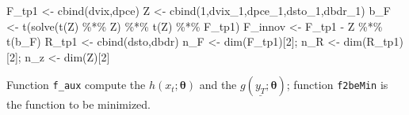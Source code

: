 \documentclass[
  12pt,
]{book}
\newenvironment{Shaded}{\begin{snugshade}}{\end{snugshade}}
\newcommand{\DecValTok}[1]{\textcolor[rgb]{0.00,0.00,0.81}{#1}}
\newcommand{\FunctionTok}[1]{\textcolor[rgb]{0.00,0.00,0.00}{#1}}
\newcommand{\NormalTok}[1]{#1}
\newcommand{\OtherTok}[1]{\textcolor[rgb]{0.56,0.35,0.01}{#1}}
\newcommand{\SpecialCharTok}[1]{\textcolor[rgb]{0.00,0.00,0.00}{#1}}
\theoremstyle{definition}
\theoremstyle{definition}
\theoremstyle{definition}
\theoremstyle{definition}
\theoremstyle{remark}
\begin{document}
\begin{Shaded}
\begin{Highlighting}[]
\NormalTok{F\_tp1 }\OtherTok{\textless{}{-}} \FunctionTok{cbind}\NormalTok{(dvix,dpce)}
\NormalTok{Z     }\OtherTok{\textless{}{-}} \FunctionTok{cbind}\NormalTok{(}\DecValTok{1}\NormalTok{,dvix\_1,dpce\_1,dsto\_1,dbdr\_1)}
\NormalTok{b\_F }\OtherTok{\textless{}{-}} \FunctionTok{t}\NormalTok{(}\FunctionTok{solve}\NormalTok{(}\FunctionTok{t}\NormalTok{(Z) }\SpecialCharTok{\%*\%}\NormalTok{ Z) }\SpecialCharTok{\%*\%} \FunctionTok{t}\NormalTok{(Z) }\SpecialCharTok{\%*\%}\NormalTok{ F\_tp1)}
\NormalTok{F\_innov }\OtherTok{\textless{}{-}}\NormalTok{ F\_tp1 }\SpecialCharTok{{-}}\NormalTok{ Z }\SpecialCharTok{\%*\%} \FunctionTok{t}\NormalTok{(b\_F)}
\NormalTok{R\_tp1 }\OtherTok{\textless{}{-}} \FunctionTok{cbind}\NormalTok{(dsto,dbdr)}
\NormalTok{n\_F }\OtherTok{\textless{}{-}} \FunctionTok{dim}\NormalTok{(F\_tp1)[}\DecValTok{2}\NormalTok{]; n\_R }\OtherTok{\textless{}{-}} \FunctionTok{dim}\NormalTok{(R\_tp1)[}\DecValTok{2}\NormalTok{]; n\_z }\OtherTok{\textless{}{-}} \FunctionTok{dim}\NormalTok{(Z)[}\DecValTok{2}\NormalTok{]}
\end{Highlighting}
\end{Shaded}

Function \texttt{f\_aux} compute the \(h(x_t;{\boldsymbol\theta})\) and the \(g(\underline{y_T};{\boldsymbol\theta})\); function \texttt{f2beMin} is the function to be minimized.
\end{document}
